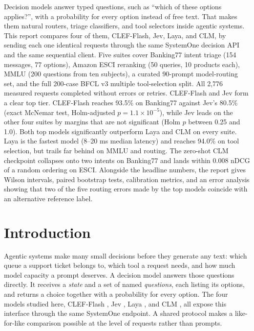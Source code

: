 \documentclass[11pt,a4paper]{article}
\begin{document}
\maketitle

\begin{abstractbox}
Decision models answer typed questions, such as ``which of these options applies?'', with a probability
for every option instead of free text. That makes them natural routers, triage classifiers, and tool
selectors inside agentic systems. This report compares four of them, CLEF-Flash, Jev, Laya, and CLM,
by sending each one identical requests through the same SystemOne decision API and the same sequential
client. Five suites cover Banking77 intent triage (154 messages, 77 options), Amazon ESCI reranking
(50 queries, 10 products each), MMLU (200 questions from ten subjects), a curated 90-prompt
model-routing set, and the full 200-case BFCL v3 multiple tool-selection split. All 2,776 measured
requests completed without errors or retries. CLEF-Flash and Jev form a clear top tier. CLEF-Flash
reaches 93.5\% on Banking77 against Jev's 80.5\% (exact McNemar test, Holm-adjusted
$p = 1.1\times10^{-5}$), while Jev leads on the other four suites by margins that are not significant
(Holm $p$ between 0.25 and 1.0). Both top models significantly outperform Laya and CLM on every suite.
Laya is the fastest model (8--20 ms median latency) and reaches 94.0\% on tool selection, but trails
far behind on MMLU and routing. The zero-shot CLM checkpoint collapses onto two intents on Banking77
and lands within 0.008 nDCG of a random ordering on ESCI. Alongside the headline numbers, the report
gives Wilson intervals, paired bootstrap tests, calibration metrics, and an error analysis showing that
two of the five routing errors made by the top models coincide with an alternative reference label.
\end{abstractbox}

\tableofcontents
\newpage

\section{Introduction}\label{sec:intro}

Agentic systems make many small decisions before they generate any text: which queue a support
ticket belongs to, which tool a request needs, and how much model capacity a prompt deserves. A
decision model answers those questions directly. It receives a \emph{state} and a set of named
\emph{questions}, each listing its options, and returns a choice together with a probability for
every option. The four models studied here, CLEF-Flash \cite{cloudflare2026clefflash},
Jev \cite{typesafe2026jev}, Laya \cite{convai2026laya}, and CLM \cite{contrastivelm2026clm}, all
expose this interface through the same SystemOne endpoint. A shared protocol makes a like-for-like
comparison possible at the level of requests rather than prompts.
\end{document}
